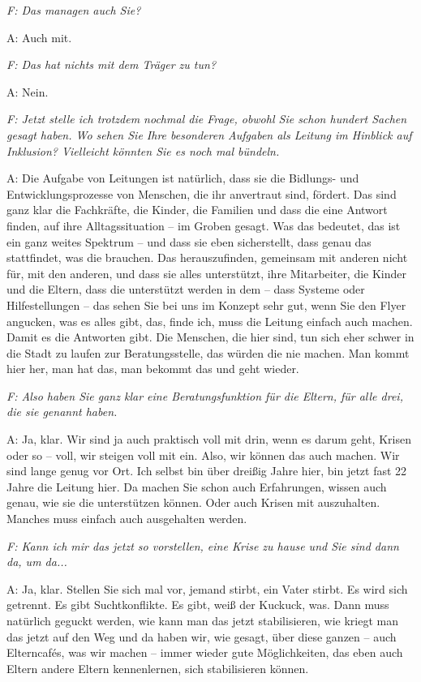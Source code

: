 \begin{linenumbers}
\emph{F: Das managen auch Sie?}

A: Auch mit. 

\emph{F: Das hat nichts mit dem Träger zu tun?}

A: Nein.

\emph{F: Jetzt stelle ich trotzdem nochmal die Frage, obwohl Sie schon hundert Sachen gesagt haben. Wo sehen Sie Ihre besonderen Aufgaben als Leitung im Hinblick auf Inklusion? Vielleicht könnten Sie es noch mal bündeln.} 

A: Die Aufgabe von Leitungen ist natürlich, dass sie die Bidlungs- und Entwicklungsprozesse von Menschen, die ihr anvertraut sind, fördert. Das sind ganz klar die Fachkräfte, die Kinder, die Familien und dass die eine Antwort finden, auf ihre Alltagssituation -- im Groben gesagt. Was das bedeutet, das ist ein ganz weites Spektrum -- und dass sie eben sicherstellt, dass genau das stattfindet, was die brauchen. Das herauszufinden, gemeinsam mit anderen nicht für, mit den anderen, und dass sie alles unterstützt, ihre Mitarbeiter, die Kinder und die Eltern, dass die unterstützt werden in dem -- dass Systeme oder Hilfestellungen -- das sehen Sie bei uns im Konzept sehr gut, wenn Sie den Flyer angucken, was es alles gibt, das, finde ich, muss die Leitung einfach auch machen. Damit es die Antworten gibt. Die Menschen, die hier sind, tun sich eher schwer in die Stadt zu laufen zur Beratungsstelle, das würden die nie machen. Man kommt hier her, man hat das, man bekommt das und geht wieder. 

\emph{F: Also haben Sie ganz klar eine Beratungsfunktion für die Eltern, für alle drei, die sie genannt haben.}

A: Ja, klar. Wir sind ja auch praktisch voll mit drin, wenn es darum geht, Krisen oder so -- voll, wir steigen voll mit ein. Also, wir können das auch machen. Wir sind lange genug vor Ort. Ich selbst bin über dreißig Jahre hier, bin jetzt fast 22 Jahre die Leitung hier. Da machen Sie schon auch Erfahrungen, wissen auch genau, wie sie die unterstützen können. Oder auch Krisen mit auszuhalten. Manches muss einfach auch ausgehalten werden. 

\emph{F: Kann ich mir das jetzt so vorstellen, eine Krise zu hause und Sie sind dann da, um da...}

A: Ja, klar. Stellen Sie sich mal vor, jemand stirbt, ein Vater stirbt. Es wird sich getrennt. Es gibt Suchtkonflikte. Es gibt, weiß der Kuckuck, was. Dann muss natürlich geguckt werden, wie kann man das jetzt stabilisieren, wie kriegt man das jetzt auf den Weg und da haben wir, wie gesagt, über diese ganzen -- auch Elterncafés, was wir machen -- immer wieder gute Möglichkeiten, das eben auch Eltern andere Eltern kennenlernen, sich stabilisieren können. 


\end{linenumbers}
